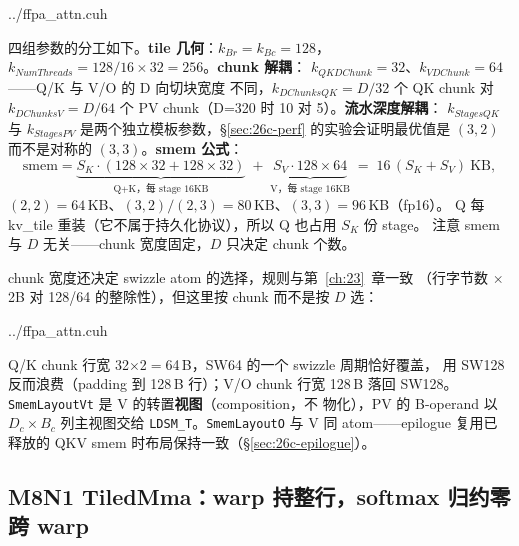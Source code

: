 \begin{lstinputlisting}[linerange={699-721},firstnumber=auto,
  title={ffpa\_attn.cuh L699-721（traits：协议参数与 smem 公式）}]{../ffpa_attn.cuh}
\end{lstinputlisting}

四组参数的分工如下。\textbf{tile 几何}：$k_{Br}{=}k_{Bc}{=}128$，
$k_{NumThreads} = 128/16 \times 32 = 256$。\textbf{chunk 解耦}：
$k_{QKDChunk}{=}32$、$k_{VDChunk}{=}64$——Q/K 与 V/O 的 D 向切块宽度
不同，$k_{DChunksQK} = D/32$ 个 QK chunk 对 $k_{DChunksV} = D/64$ 个
PV chunk（D=320 时 10 对 5）。\textbf{流水深度解耦}：
$k_{StagesQK}$ 与 $k_{StagesPV}$ 是两个独立模板参数，\S\ref{sec:26c-perf}
的实验会证明最优值是 $(3,2)$ 而不是对称的 $(3,3)$。\textbf{smem 公式}：
\begin{equation}\label{eq:26c-smem}
  \text{smem} = \underbrace{S_K \cdot (128{\times}32 + 128{\times}32)}_{\text{Q+K，每 stage }16\text{KB}}
  \;+\; \underbrace{S_V \cdot 128{\times}64}_{\text{V，每 stage }16\text{KB}}
  \;=\; 16\,(S_K + S_V)\ \text{KB} ,
\end{equation}
$(2,2){=}64$\,KB、$(3,2)/(2,3){=}80$\,KB、$(3,3){=}96$\,KB（fp16）。
Q 每 kv\_tile 重装（它不属于持久化协议），所以 Q 也占用 $S_K$ 份 stage。
注意 smem 与 $D$ 无关——chunk 宽度固定，$D$ 只决定 chunk 个数。

chunk 宽度还决定 swizzle atom 的选择，规则与第~\ref{ch:23}~章一致
（行字节数 $\times$ 2B 对 128/64 的整除性），但这里按 chunk 而不是按
$D$ 选：

\begin{lstinputlisting}[linerange={736-756},firstnumber=auto,
  title={ffpa\_attn.cuh L736-756（chunk 尺寸决定 swizzle；M8N1 双 TiledMma；装载/写回 atom）}]{../ffpa_attn.cuh}
\end{lstinputlisting}

Q/K chunk 行宽 32$\times$2$=$64\,B，SW64 的一个 swizzle 周期恰好覆盖，
用 SW128 反而浪费（padding 到 128\,B 行）；V/O chunk 行宽 128\,B 落回
SW128。\texttt{SmemLayoutVt} 是 V 的转置\textbf{视图}（composition，不
物化），PV 的 B-operand 以 $D_c \times B_c$ 列主视图交给
\texttt{LDSM\_T}。\texttt{SmemLayoutO} 与 V 同 atom——epilogue 复用已
释放的 QKV smem 时布局保持一致（\S\ref{sec:26c-epilogue}）。

\subsection{M8N1 TiledMma：warp 持整行，softmax 归约零跨 warp}\label{sec:26c-mma}

